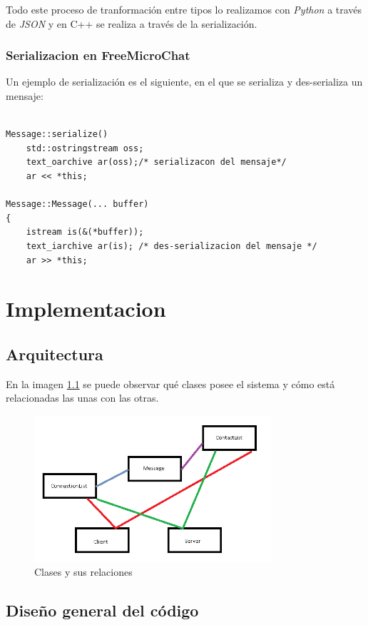 \documentclass[a4paper,11pt,titlepage,halfparskip,cleardoubleempty]{scrbook}
\begin{document}
Todo este proceso de tranformación entre tipos lo realizamos con  \textit{Python} a través de  \textit{JSON} y en C++ se realiza a través de la serialización.

\subsection{Serializacion en FreeMicroChat}
Un ejemplo de serialización es el siguiente, en el que se serializa y des-serializa un mensaje:
\begin{lstlisting}[style=C++]

Message::serialize()
    std::ostringstream oss;
    text_oarchive ar(oss);/* serializacon del mensaje*/
    ar << *this;

Message::Message(... buffer)
{
    istream is(&(*buffer));
    text_iarchive ar(is); /* des-serializacion del mensaje */
    ar >> *this;
\end{lstlisting}

\chapter{Implementacion}
\section{Arquitectura}
En la imagen  \ref{img:arq} se puede observar qué clases posee el sistema y cómo está relacionadas las unas con las otras.


\begin{figure}[h!]
\centering
     \includegraphics[width=250pt]{img/Arquitectura.png}
    \caption{Clases y sus relaciones}
\label{img:arq}
  \end{figure}





  \section{Diseño general del código}
\end{document}
